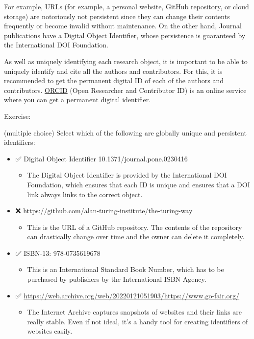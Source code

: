 \documentclass[
  letterpaper,
  DIV=11,
  numbers=noendperiod]{scrreport}
\providecommand{\tightlist}{%
  \setlength{\itemsep}{0pt}\setlength{\parskip}{0pt}}\usepackage{longtable,booktabs,array}
\begin{document}
For example, URLs (for example, a personal website, GitHub repository,
or cloud storage) are notoriously not persistent since they can change
their contents frequently or become invalid without maintenance. On the
other hand, Journal publications have a Digital Object Identifier, whose
persistence is guaranteed by the International DOI Foundation.

As well as uniquely identifying each research object, it is important to
be able to uniquely identify and cite all the authors and contributors.
For this, it is recommended to get the permanent digital ID of each of
the authors and contributors. \href{https://orcid.org/}{ORCID} (Open
Researcher and Contributor ID) is an online service where you can get a
permanent digital identifier.

Exercise:

(multiple choice) Select which of the following are globally unique and
persistent identifiers:

\begin{itemize}
\tightlist
\item
  ✅ Digital Object Identifier 10.1371/journal.pone.0230416

  \begin{itemize}
  \tightlist
  \item
    The Digital Object Identifier is provided by the International DOI
    Foundation, which ensures that each ID is unique and ensures that a
    DOI link always links to the correct object.
  \end{itemize}
\item
  ❌ \url{https://github.com/alan-turing-institute/the-turing-way}

  \begin{itemize}
  \tightlist
  \item
    This is the URL of a GitHub repository. The contents of the
    repository can drastically change over time and the owner can delete
    it completely.
  \end{itemize}
\item
  ✅ ISBN-13: 978-0735619678

  \begin{itemize}
  \tightlist
  \item
    This is an International Standard Book Number, which has to be
    purchased by publishers by the International ISBN Agency.
  \end{itemize}
\item
  ✅
  \url{https://web.archive.org/web/20220121051903/https://www.go-fair.org/}

  \begin{itemize}
  \tightlist
  \item
    The Internet Archive captures snapshots of websites and their links
    are really stable. Even if not ideal, it's a handy tool for creating
    identifiers of websites easily.
  \end{itemize}
\end{itemize}
\end{document}
